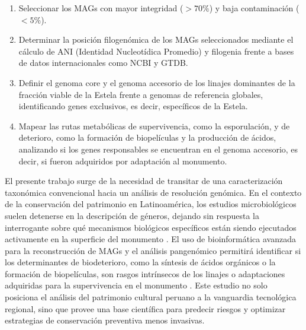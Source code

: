 

\begin{enumerate}
    \item Seleccionar los MAGs con mayor integridad ($>70\%$) y baja contaminación ($<5\%$).
    \item Determinar la posición filogenómica de los MAGs seleccionados mediante el cálculo de ANI (Identidad Nucleotídica Promedio) y filogenia frente a bases de datos internacionales como NCBI y GTDB.
    \item Definir el genoma core y el genoma accesorio de los linajes dominantes de la fracción viable de la Estela frente a genomas de referencia globales, identificando genes exclusivos, es decir, específicos de la Estela.
    \item Mapear las rutas metabólicas de supervivencia, como la esporulación, y de deterioro, como la formación de biopelículas y la producción de ácidos, analizando si los genes responsables se encuentran en el genoma accesorio, es decir, si fueron adquiridos por adaptación al monumento.
\end{enumerate}


El presente trabajo surge de la necesidad de transitar de una caracterización taxonómica convencional hacia un análisis de resolución genómica. En el contexto de la conservación del patrimonio en Latinoamérica, los estudios microbiológicos suelen detenerse en la descripción de géneros, dejando sin respuesta la interrogante sobre qué mecanismos biológicos específicos están siendo ejecutados activamente en la superficie del monumento \cite{villa2016,alonso2025}. El uso de bioinformática avanzada para la reconstrucción de MAGs y el análisis pangenómico permitirá identificar si los determinantes de biodeterioro, como la síntesis de ácidos orgánicos o la formación de biopelículas, son rasgos intrínsecos de los linajes o adaptaciones adquiridas para la supervivencia en el monumento \cite{skipper2022,jroundi2020}. Este estudio no solo posiciona el análisis del patrimonio cultural peruano a la vanguardia tecnológica regional, sino que provee una base científica para predecir riesgos y optimizar estrategias de conservación preventiva menos invasivas.

